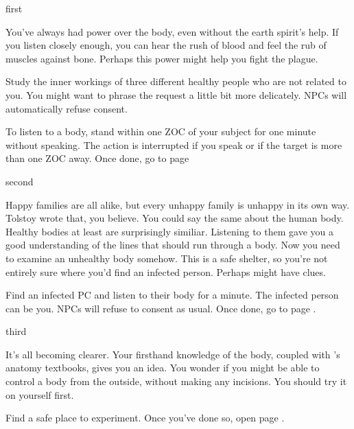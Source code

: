 \documentclass[greennotebook]{guildcamp4} %
\begin{document}
\startnotebook{\nRebelLab{}}

\begin{page}{first}

You've always had power over the body, even without the earth spirit's help. If you listen closely enough, you can hear the rush of blood and feel the rub of muscles against bone. Perhaps this power might help you fight the plague. 

Study the inner workings of three different healthy people who are not related to you. You might want to phrase the request a little bit more delicately. NPCs will automatically refuse consent. 

To listen to a body, stand within one ZOC of your subject for one minute without speaking. The action is interrupted if you speak or if the target is more than one ZOC away. Once done, go to page 

\end{page}

\begin{page}{second}

Happy families are all alike, but every unhappy family is unhappy in its own way. Tolstoy wrote that, you believe. You could say the same about the human body. Healthy bodies at least are surprisingly similiar. Listening to them gave you a good understanding of the lines that should run through a body. Now you need to examine an unhealthy body somehow. This is a safe shelter, so you're not entirely sure where you'd find an infected person. Perhaps \cOutsider{} might have clues.

Find an infected PC and listen to their body for a minute. The infected person can be you. NPCs will refuse to consent as usual. Once done, go to page .

\end{page}

\begin{page}{third}

It's all becoming clearer. Your firsthand knowledge of the body, coupled with \cOutsider{}'s anatomy textbooks, gives you an idea. You wonder if you might be able to control a body from the outside, without making any incisions. You should try it on yourself first.

Find a safe place to experiment. Once you've done so, open page .

\end{page}
\end{document}

